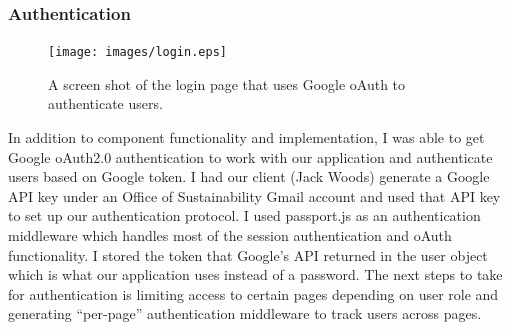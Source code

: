 \documentclass[letterpaper,10pt,serif,draftclsnofoot,onecolumn,compsoc,titlepage]{IEEEtran}
\begin{document}
\subsubsection{Authentication}
\begin{figure}[H]
  \centering
  \texttt{[image: images/login.eps]}
  \caption{A screen shot of the login page that uses Google oAuth to authenticate users.}
\end{figure}
In addition to component functionality and implementation, I was able to get Google oAuth2.0 authentication to work with our application and authenticate users based on Google token. I had our client (Jack Woods) generate a Google API key under an Office of Sustainability Gmail account and used that API key to set up our authentication protocol. I used passport.js as an authentication middleware which handles most of the session authentication and oAuth functionality. I stored the token that Google's API returned in the user object which is what our application uses instead of a password. The next steps to take for authentication is limiting access to certain pages depending on user role and generating ``per-page'' authentication middleware to track users across pages.
\end{document}
